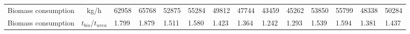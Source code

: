 \documentclass[a4paper, titlepage]{article}
\begin{document}
\begin{table}
\begin{tabular}{|| c | c | C{0.8cm} | C{0.8cm} | C{0.8cm} | C{0.8cm}| C{0.8cm} | C{0.8cm} |  C{0.8cm} | C{0.8cm}| C{0.8cm} | C{0.8cm} | C{0.8cm} |  C{0.8cm} ||}
        Biomass consumption                 & kg/h                   & 62958                                          & 65768                                        & 52875                                      & 55284                                    & 49812                                  & 47744                                    & 43459   & 45262   & 53850   & 55799   & 48338   & 50284   \\
        Biomass consumption                 & $t_{bio}$/$t_{urea}$   & 1.799                                          & 1.879                                        & 1.511                                      & 1.580                                    & 1.423                                  & 1.364                                    & 1.242   & 1.293   & 1.539   & 1.594   & 1.381   & 1.437   \\
        \hline


\end{tabular}
\end{table}
\end{document}
